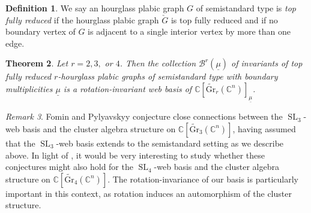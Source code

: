 \documentclass{amsart}
\newtheorem{theorem}{Theorem}[section]
\theoremstyle{definition}
\newtheorem{definition}[theorem]{Definition}
\theoremstyle{remark}
\newtheorem{remark}[theorem]{Remark}
\numberwithin{equation}{section}
\DeclareMathOperator{\SL}{SL}
\begin{document}
\begin{definition}
    We say an hourglass plabic graph $G$ of semistandard type is \emph{top fully reduced} if the hourglass plabic graph $\check{G}$ is top fully reduced and if no boundary vertex of $G$ is adjacent to a single interior vertex by more than one edge.
\end{definition}

\begin{theorem}
\label{thm:semistandard}
    Let $r=2,3,$ or $4$. Then the collection $\mathscr{B}^r(\underline{\mu})$ of invariants of top fully reduced $r$-hourglass plabic graphs of semistandard type with boundary multiplicities $\underline{\mu}$ is a rotation-invariant web basis of $\mathbb{C}[\widetilde{\mathrm{Gr}}_r(\mathbb{C}^n)]_{\underline{\mu}}$. 
\end{theorem}

\begin{remark}
    Fomin and Pylyavskyy \cite{Fomin-Pylyavskyy-advances} conjecture close connections between the $\SL_3$-web basis and the cluster algebra structure on $\mathbb{C}[\widetilde{\mathrm{Gr}}_3(\mathbb{C}^n)]$, having assumed that the $\SL_3$-web basis extends to the semistandard setting as we describe above. In light of , it would be very interesting to study whether these conjectures might also hold for the $\SL_4$-web basis and the cluster algebra structure on $\mathbb{C}[\widetilde{\mathrm{Gr}}_4(\mathbb{C}^n)]$. The rotation-invariance of our basis is particularly important in this context, as rotation induces an automorphism of the cluster structure.
\end{remark}
\end{document}
